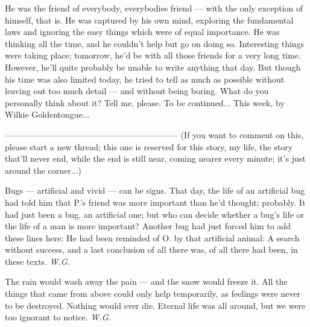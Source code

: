 He was the friend of everybody, everybodies friend --- with the only exception of himself, that is. 
He was captured by his own mind, exploring the fundamental laws and ignoring the easy things which were of equal importance. 
He was thinking all the time, and he couldn't help but go on doing so. 
Interesting things were taking place; tomorrow, he'd be with all those friends for a very long time. However, he'll quite probably be unable to write anything that day. 
But though his time was also limited today, he tried to tell as much as possible without leaving out too much detail --- and without being boring. 
What do you personally think about it? Tell me, please. 
To be continued...
This week, by Wilkie Goldentongue...

--------------------------------------------------------------
(If you want to comment on this, please start a new thread; this one is reserved for this story, my life, the story that'll never end, while the end is still near, coming nearer every minute; it's just around the corner...)

Bugs --- 
artificial and vivid --- 
can be signs. 
That day, 
the life of an artificial bug 
had told him 
that P.'s friend 
was more important 
than he'd thought; 
probably. 
It had just been a bug, 
an artificial one; 
but who can decide 
whether a bug's life 
or the life of a man 
is more important? 
Another bug had just forced him to add these lines here: 
He had been reminded of O. by that artificial animal: 
A search without success, 
and a last conclusion of all there was, 
of all there had been, 
in these texts. 
\emph{W.G.}

The rain 
would wash away the pain --- 
and the snow 
would freeze it. 
All the things that came from above 
could only help 
temporarily, 
as feelings 
were never to be destroyed. 
Nothing would ever die. 
Eternal life was all around, 
but we were too ignorant to notice. 
\emph{W.G.}
